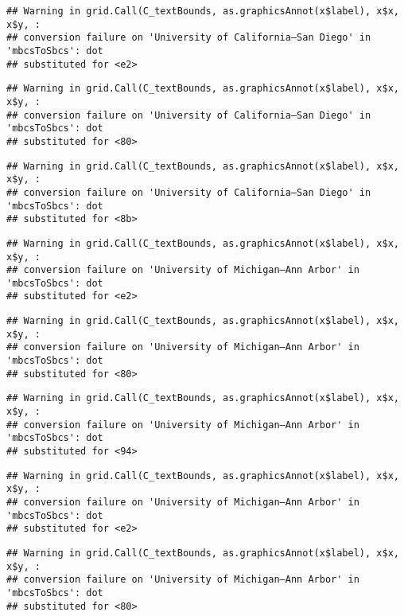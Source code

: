 \documentclass[]{article}
\begin{document}
\begin{verbatim}
## Warning in grid.Call(C_textBounds, as.graphicsAnnot(x$label), x$x, x$y, :
## conversion failure on 'University of California—​San Diego' in 'mbcsToSbcs': dot
## substituted for <e2>
\end{verbatim}

\begin{verbatim}
## Warning in grid.Call(C_textBounds, as.graphicsAnnot(x$label), x$x, x$y, :
## conversion failure on 'University of California—​San Diego' in 'mbcsToSbcs': dot
## substituted for <80>
\end{verbatim}

\begin{verbatim}
## Warning in grid.Call(C_textBounds, as.graphicsAnnot(x$label), x$x, x$y, :
## conversion failure on 'University of California—​San Diego' in 'mbcsToSbcs': dot
## substituted for <8b>
\end{verbatim}

\begin{verbatim}
## Warning in grid.Call(C_textBounds, as.graphicsAnnot(x$label), x$x, x$y, :
## conversion failure on 'University of Michigan—​Ann Arbor' in 'mbcsToSbcs': dot
## substituted for <e2>
\end{verbatim}

\begin{verbatim}
## Warning in grid.Call(C_textBounds, as.graphicsAnnot(x$label), x$x, x$y, :
## conversion failure on 'University of Michigan—​Ann Arbor' in 'mbcsToSbcs': dot
## substituted for <80>
\end{verbatim}

\begin{verbatim}
## Warning in grid.Call(C_textBounds, as.graphicsAnnot(x$label), x$x, x$y, :
## conversion failure on 'University of Michigan—​Ann Arbor' in 'mbcsToSbcs': dot
## substituted for <94>
\end{verbatim}

\begin{verbatim}
## Warning in grid.Call(C_textBounds, as.graphicsAnnot(x$label), x$x, x$y, :
## conversion failure on 'University of Michigan—​Ann Arbor' in 'mbcsToSbcs': dot
## substituted for <e2>
\end{verbatim}

\begin{verbatim}
## Warning in grid.Call(C_textBounds, as.graphicsAnnot(x$label), x$x, x$y, :
## conversion failure on 'University of Michigan—​Ann Arbor' in 'mbcsToSbcs': dot
## substituted for <80>
\end{verbatim}
\end{document}
